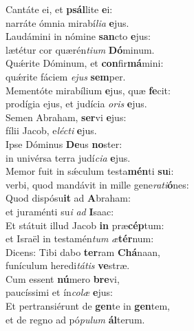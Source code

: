 \evenverse Cantáte ei, et \textbf{psál}lite \textbf{e}i:~\*\\
\evenverse narráte ómnia mirabí\textit{li}\textit{a} \textbf{e}jus.\\
\oddverse Laudámini in nómine \textbf{san}cto \textbf{e}jus:~\*\\
\oddverse lætétur cor quærén\textit{ti}\textit{um} \textbf{Dó}minum.\\
\evenverse Quǽrite Dóminum, et \textbf{con}fir\textbf{má}mini:~\*\\
\evenverse quǽrite fáciem \textit{e}\textit{jus} \textbf{sem}per.\\
\oddverse Mementóte mirabílium \textbf{e}jus, quæ \textbf{fe}cit:~\*\\
\oddverse prodígia ejus, et judícia \textit{o}\textit{ris} \textbf{e}jus.\\
\evenverse Semen Abraham, \textbf{ser}vi \textbf{e}jus:~\*\\
\evenverse fílii Jacob, e\textit{lé}\textit{cti} \textbf{e}jus.\\
\oddverse Ipse Dóminus \textbf{De}us \textbf{no}ster:~\*\\
\oddverse in univérsa terra judí\textit{ci}\textit{a} \textbf{e}jus.\\
\evenverse Memor fuit in sǽculum testa\textbf{mén}ti \textbf{su}i:~\*\\
\evenverse verbi, quod mandávit in mille gene\textit{ra}\textit{ti}\textbf{ó}nes:\\
\oddverse Quod dispósu\textbf{it} ad \textbf{A}braham:~\*\\
\oddverse et juraménti su\textit{i} \textit{ad} \textbf{I}saac:\\
\evenverse Et státuit illud Jacob \textbf{in} præ\textbf{cép}tum:~\*\\
\evenverse et Israël in testamén\textit{tum} \textit{æ}\textbf{tér}num:\\
\oddverse Dicens: Tibi dabo \textbf{ter}ram \textbf{Chá}naan,~\*\\
\oddverse funículum heredi\textit{tá}\textit{tis} \textbf{ve}stræ.\\
\evenverse Cum essent \textbf{nú}mero \textbf{bre}vi,~\*\\
\evenverse paucíssimi et ín\textit{co}\textit{læ} \textbf{e}jus:\\
\oddverse Et pertransiérunt de \textbf{gen}te in \textbf{gen}tem,~\*\\
\oddverse et de regno ad pó\textit{pu}\textit{lum} \textbf{ál}terum.\\
